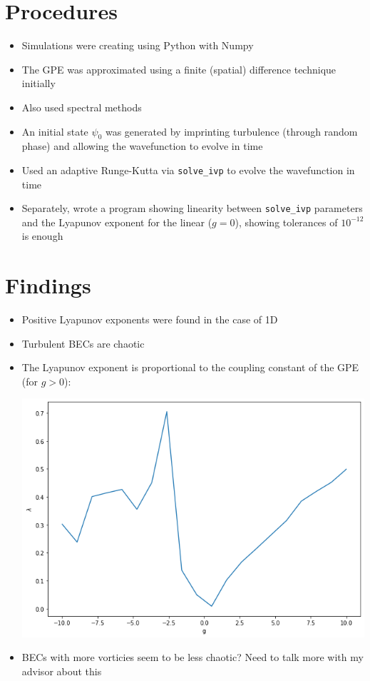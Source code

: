 \documentclass{homework}
\begin{document}
	\section{Procedures}
	\begin{itemize}
		\item Simulations were creating using Python with Numpy
		\item The GPE was approximated using a finite (spatial) difference technique initially
		\item Also used spectral methods
		\item An initial state $\psi_0$ was generated by imprinting turbulence (through random phase) and allowing the wavefunction to evolve in time
		\item Used an adaptive Runge-Kutta via \texttt{solve\_ivp} to evolve the wavefunction in time
		\item Separately, wrote a program showing linearity between \texttt{solve\_ivp} parameters and the Lyapunov exponent for the linear ($g=0$), showing tolerances of $10^{-12}$ is enough
	\end{itemize}

	\section{Findings}
	\begin{itemize}
		\item Positive Lyapunov exponents were found in the case of 1D
		\item Turbulent BECs are chaotic
		\item The Lyapunov exponent is proportional to the coupling constant of the GPE (for $g>0$):
		
		\begin{center}
			\includegraphics[width=0.7\linewidth]{g_vs_exp}
		\end{center}
		
		\item BECs with more vorticies seem to be less chaotic? Need to talk more with my advisor about this
	\end{itemize}
\end{document}

